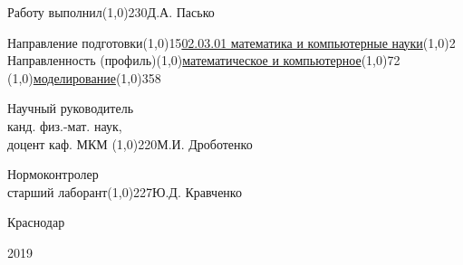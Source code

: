 \documentclass[a4paper]{article}
\begin{document}
\begin{titlepage}
\begin{spacing}{1}
		\begin{center}
			\begin{flushleft}
				\normalsize Работу выполнил\line(1,0){230}Д.А. Пасько			
			\end{flushleft} 
			\begin{flushleft}
				\normalsize Направление подготовки\line(1,0){15}\uline{02.03.01 математика и компьютерные науки}\line(1,0){2}\\
				\vspace{\baselineskip}
				\normalsize Направленность (профиль)\line(1,0){}\uline{математическое и компьютерное}\line(1,0){72}\\ 
				\normalsize \line(1,0){}\uline{моделирование}\line(1,0){358}\\
			\end{flushleft}
			\begin{flushleft}
				\normalsize Научный руководитель\\
				\normalsize канд. физ.-мат. наук,\\
				\normalsize доцент каф. МКМ \line(1,0){220}М.И. Дроботенко\\
			\end{flushleft}
			\begin{flushleft}
				\normalsize Нормоконтролер\\
				\normalsize старший лаборант\line(1,0){227}Ю.Д. Кравченко\\
			\end{flushleft}
			
			
		\end{center}
		
		
		\vspace{\fill}
		
		
		\centerline {Краснодар}
		\centerline {2019} 
	\end{spacing}	
\end{titlepage}
  
\newpage

\begin{spacing}{0.9}
  \tableofcontents
\end{spacing}


\newpage
\setcounter{page}{3}
\end{document}
